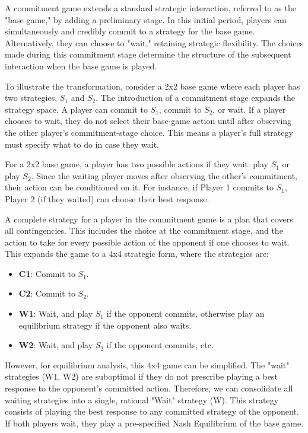 \documentclass{article}
\begin{document}
\begin{definition}    
A commitment game extends a standard strategic interaction, referred to as the "base game," by adding a preliminary stage. In this initial period, players can simultaneously and credibly commit to a strategy for the base game. Alternatively, they can choose to "wait," retaining strategic flexibility. The choices made during this commitment stage determine the structure of the subsequent interaction when the base game is played.
\end{definition}

To illustrate the transformation, consider a 2x2 base game where each player has two strategies, $S_1$ and $S_2$. The introduction of a commitment stage expands the strategy space. A player can commit to $S_1$, commit to $S_2$, or wait. If a player chooses to wait, they do not select their base-game action until after observing the other player's commitment-stage choice. This means a player's full strategy must specify what to do in case they wait.

For a 2x2 base game, a player has two possible actions if they wait: play $S_1$ or play $S_2$. Since the waiting player moves after observing the other's commitment, their action can be conditioned on it. For instance, if Player 1 commits to $S_1$, Player 2 (if they waited) can choose their best response.

A complete strategy for a player in the commitment game is a plan that covers all contingencies. This includes the choice at the commitment stage, and the action to take for every possible action of the opponent if one chooses to wait. This expands the game to a 4x4 strategic form, where the strategies are:
\begin{itemize}
    \item \textbf{C1}: Commit to $S_1$.
    \item \textbf{C2}: Commit to $S_2$.
    \item \textbf{W1}: Wait, and play $S_1$ if the opponent commits, otherwise play an equilibrium strategy if the opponent also waits.
    \item \textbf{W2}: Wait, and play $S_2$ if the opponent commits, etc.
\end{itemize}

However, for equilibrium analysis, this 4x4 game can be simplified. The "wait" strategies (W1, W2) are suboptimal if they do not prescribe playing a best response to the opponent's committed action. Therefore, we can consolidate all waiting strategies into a single, rational "Wait" strategy (W). This strategy consists of playing the best response to any committed strategy of the opponent. If both players wait, they play a pre-specified Nash Equilibrium of the base game.
\end{document}
